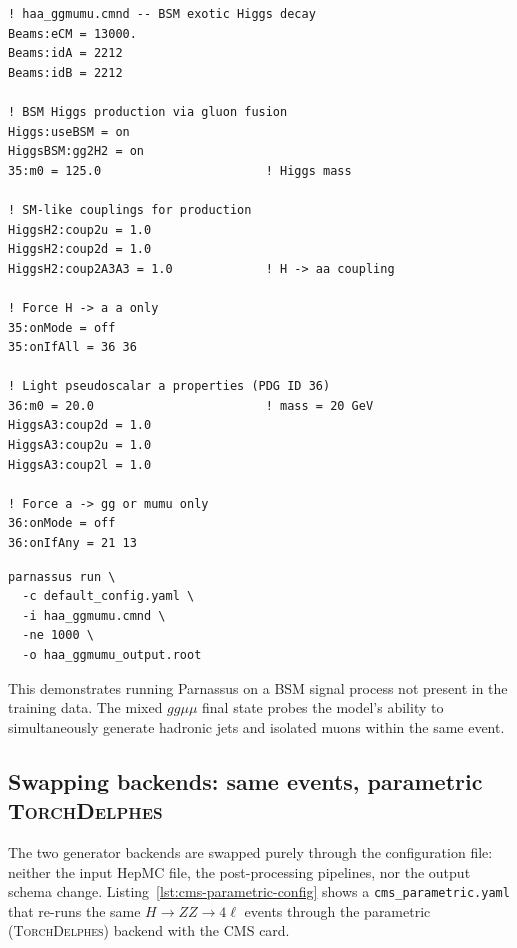 \documentclass[11pt,a4paper]{article}          %
\begin{document}
\begin{lstlisting}[style=cmnd,caption={Pythia8 steering card for BSM $H \to aa \to gg\mu\mu$.}]
! haa_ggmumu.cmnd -- BSM exotic Higgs decay
Beams:eCM = 13000.
Beams:idA = 2212
Beams:idB = 2212

! BSM Higgs production via gluon fusion
Higgs:useBSM = on
HiggsBSM:gg2H2 = on
35:m0 = 125.0                       ! Higgs mass

! SM-like couplings for production
HiggsH2:coup2u = 1.0
HiggsH2:coup2d = 1.0
HiggsH2:coup2A3A3 = 1.0             ! H -> aa coupling

! Force H -> a a only
35:onMode = off
35:onIfAll = 36 36

! Light pseudoscalar a properties (PDG ID 36)
36:m0 = 20.0                        ! mass = 20 GeV
HiggsA3:coup2d = 1.0
HiggsA3:coup2u = 1.0
HiggsA3:coup2l = 1.0

! Force a -> gg or mumu only
36:onMode = off
36:onIfAny = 21 13
\end{lstlisting}

\begin{lstlisting}[style=bash]
parnassus run \
  -c default_config.yaml \
  -i haa_ggmumu.cmnd \
  -ne 1000 \
  -o haa_ggmumu_output.root
\end{lstlisting}

\noindent
This demonstrates running Parnassus on a BSM signal process not present in the
training data. The mixed $gg\mu\mu$ final state probes the model's ability to
simultaneously generate hadronic jets and isolated muons within the same event.

\subsection{Swapping backends: same events, parametric \textsc{TorchDelphes}}
\label{subsec:swap-backends}

The two generator backends are swapped purely through the configuration file:
neither the input HepMC file, the post-processing pipelines, nor the output
schema change. Listing~\ref{lst:cms-parametric-config} shows a
\texttt{cms\_parametric.yaml} that re-runs the same $H \to ZZ \to 4\ell$
events through the parametric (\textsc{TorchDelphes}) backend with the CMS
card.
\end{document}
